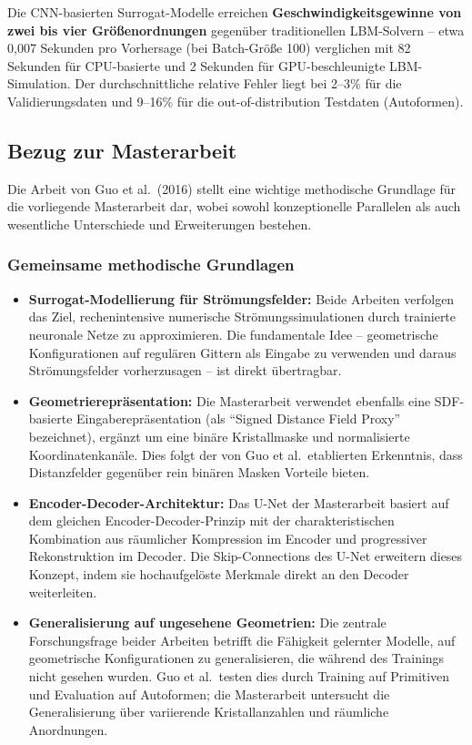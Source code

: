 \documentclass[a4paper,12pt]{article}
\begin{document}
Die CNN-basierten Surrogat-Modelle erreichen \textbf{Geschwindigkeitsgewinne von zwei bis vier Größenordnungen} gegenüber traditionellen LBM-Solvern -- etwa 0,007 Sekunden pro Vorhersage (bei Batch-Größe 100) verglichen mit 82 Sekunden für CPU-basierte und 2 Sekunden für GPU-beschleunigte LBM-Simulation. Der durchschnittliche relative Fehler liegt bei 2--3\% für die Validierungsdaten und 9--16\% für die out-of-distribution Testdaten (Autoformen).

\subsection*{Bezug zur Masterarbeit}

Die Arbeit von Guo et al.\ (2016) stellt eine wichtige methodische Grundlage für die vorliegende Masterarbeit dar, wobei sowohl konzeptionelle Parallelen als auch wesentliche Unterschiede und Erweiterungen bestehen.

\subsubsection*{Gemeinsame methodische Grundlagen}

\begin{itemize}
    \item \textbf{Surrogat-Modellierung für Strömungsfelder:} Beide Arbeiten verfolgen das Ziel, rechenintensive numerische Strömungssimulationen durch trainierte neuronale Netze zu approximieren. Die fundamentale Idee -- geometrische Konfigurationen auf regulären Gittern als Eingabe zu verwenden und daraus Strömungsfelder vorherzusagen -- ist direkt übertragbar.
    
    \item \textbf{Geometrierepräsentation:} Die Masterarbeit verwendet ebenfalls eine SDF-basierte Eingaberepräsentation (als ``Signed Distance Field Proxy'' bezeichnet), ergänzt um eine binäre Kristallmaske und normalisierte Koordinatenkanäle. Dies folgt der von Guo et al.\ etablierten Erkenntnis, dass Distanzfelder gegenüber rein binären Masken Vorteile bieten.
    
    \item \textbf{Encoder-Decoder-Architektur:} Das U-Net der Masterarbeit basiert auf dem gleichen Encoder-Decoder-Prinzip mit der charakteristischen Kombination aus räumlicher Kompression im Encoder und progressiver Rekonstruktion im Decoder. Die Skip-Connections des U-Net erweitern dieses Konzept, indem sie hochaufgelöste Merkmale direkt an den Decoder weiterleiten.
    
    \item \textbf{Generalisierung auf ungesehene Geometrien:} Die zentrale Forschungsfrage beider Arbeiten betrifft die Fähigkeit gelernter Modelle, auf geometrische Konfigurationen zu generalisieren, die während des Trainings nicht gesehen wurden. Guo et al.\ testen dies durch Training auf Primitiven und Evaluation auf Autoformen; die Masterarbeit untersucht die Generalisierung über variierende Kristallanzahlen und räumliche Anordnungen.
\end{itemize}
\end{document}

